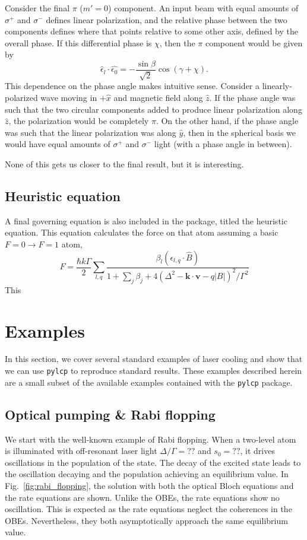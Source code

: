 \documentclass[final,5p,times,twocolumn]{elsarticle}
\begin{document}
Consider the final $\pi$ ($m'=0$) component.  An input beam with equal amounts
of $\sigma^+$ and $\sigma^-$  defines linear polarization, and the relative
phase between the two components defines where that points relative to some
other axis, defined by the overall  phase.  If this differential phase is
$\chi$, then the $\pi$ component would be given by
\begin{equation}
  \hat{\epsilon}_l\cdot\hat{\epsilon_0} = -\frac{\sin\beta}{\sqrt{2}}
  \cos(\gamma+\chi).
\end{equation}
This dependence on the phase angle makes intuitive sense.  Consider a
linearly-polarized wave moving in $+\hat{x}$ and magnetic field along $\hat{z}$.
If the phase angle was such that the two circular components added to produce
linear polarization along $\hat{z}$, the polarization would be completely $\pi$.
On the other hand, if the phase angle was such that the linear polarization was
along $\hat{y}$, then in the spherical basis we would have equal amounts of
$\sigma^+$ and $\sigma^-$ light (with a phase angle in between).

None of this gets us closer to the final result, but it is interesting.

\subsection{Heuristic equation}
A final governing equation is also included in the package, titled the heuristic equation.  This equation calculates the force on that atom assuming a basic $F=0\rightarrow F=1$ atom,
\begin{equation}
	F = \frac{\hbar k \Gamma}{2}\sum_{l,q} \frac{\beta_l \left(\epsilon_{l,q}\cdot \hat{B}\right)}{1+\sum_j\beta_j+4(\Delta^2 - \mathbf{k}\cdot\mathbf{v} - q |B|)^2/\Gamma^2} 
\end{equation}
This

\section{Examples}
In this section, we cover several standard examples of laser cooling and show that we can use {\tt pylcp} to reproduce standard results.  These examples described herein are a small subset of the available examples contained with the {\tt pylcp} package.

\subsection{Optical pumping \& Rabi flopping}
We start with the well-known example of Rabi flopping.  When a two-level atom is illuminated with off-resonant laser light $\Delta/\Gamma=??$ and $s_0 = ??$, it drives oscillations in the population of the state.  The decay of the excited state leads to the oscillation decaying and the population achieving an equilibrium value.  In Fig.~\ref{fig:rabi_flopping}, the solution with both the optical Bloch equations and the rate equations are shown.  Unlike the OBEs, the rate equations show no oscillation.  This is expected as the rate equations neglect the coherences in the OBEs.  Nevertheless, they both asymptotically approach the same equilibrium value.
\end{document}
